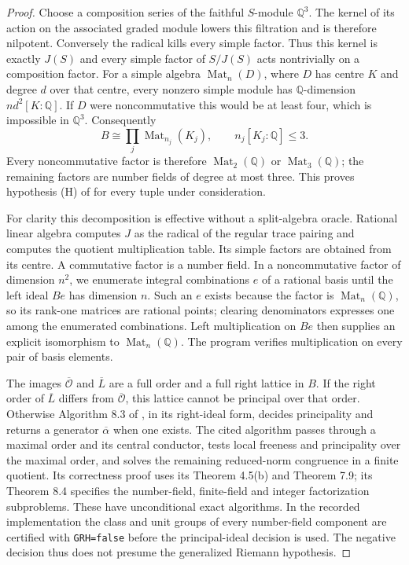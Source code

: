 \begin{proof}
Choose a composition series of the faithful $S$-module $\mathbb Q^3$.
The kernel of its action on the associated graded module lowers this
filtration and is therefore nilpotent. Conversely the radical kills
every simple factor. Thus this kernel is exactly $J(S)$ and every
simple factor of $S/J(S)$ acts nontrivially on a composition factor.
For a simple algebra $\operatorname{Mat}_n(D)$, where $D$ has centre
$K$ and degree $d$ over that centre, every nonzero simple module has
$\mathbb Q$-dimension $n d^2[K:\mathbb Q]$. If $D$ were
noncommutative this would be at least four, which is impossible in
$\mathbb Q^3$. Consequently
\[
 B\cong\prod_j\operatorname{Mat}_{n_j}(K_j),\qquad
 n_j[K_j:\mathbb Q]\le3.                                    \tag{F.IC3}
\]
Every noncommutative factor is therefore
$\operatorname{Mat}_2(\mathbb Q)$ or
$\operatorname{Mat}_3(\mathbb Q)$; the remaining factors are number
fields of degree at most three. This proves hypothesis (H) of
\cite[Algorithm 8.3]{rootBHJ22} for every tuple under consideration.

For clarity this decomposition is effective without a split-algebra
oracle. Rational linear algebra computes $J$ as the radical of the
regular trace pairing and computes the quotient multiplication table.
Its simple factors are obtained from its centre. A commutative factor
is a number field. In a noncommutative factor of dimension $n^2$, we
enumerate integral combinations $e$ of a rational basis until the
left ideal $Be$ has dimension $n$. Such an $e$ exists because the
factor is $\operatorname{Mat}_n(\mathbb Q)$, so its rank-one matrices
are rational points; clearing denominators expresses one among the
enumerated combinations. Left multiplication on $Be$ then supplies
an explicit isomorphism to $\operatorname{Mat}_n(\mathbb Q)$.
The program verifies multiplication on every pair of basis elements.

The images $\overline{\mathcal O}$ and $\overline L$ are a full order
and a full right lattice in $B$. If the right order of
$\overline L$ differs from $\overline{\mathcal O}$, this lattice
cannot be principal over that order. Otherwise Algorithm 8.3 of
\cite{rootBHJ22}, in its right-ideal form, decides principality and
returns a generator $\overline\alpha$ when one exists. The cited
algorithm passes through a maximal order and its central conductor,
tests local freeness and principality over the maximal order, and
solves the remaining reduced-norm congruence in a finite quotient.
Its correctness proof uses its Theorem 4.5(b) and Theorem 7.9; its
Theorem 8.4 specifies the number-field, finite-field and integer
factorization subproblems. These have unconditional exact algorithms.
In the recorded implementation the class and unit groups of every
number-field component are certified with \texttt{GRH=false} before
the principal-ideal decision is used. The negative decision thus
does not presume the generalized Riemann hypothesis.


\end{proof}
